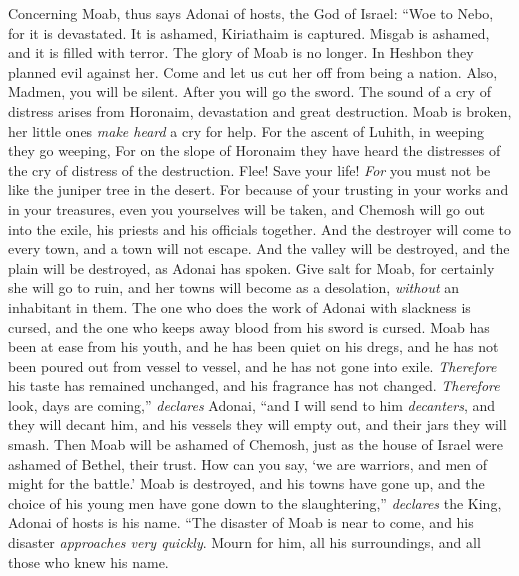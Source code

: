 \begin{biblechapter} %
 Concerning Moab, thus says Adonai of hosts, the God of Israel:
\verse “Woe to Nebo, 
for it is devastated. 
It is ashamed, 
Kiriathaim is captured. 
Misgab is ashamed, 
and it is filled with terror.
\verse The glory of Moab is no longer. 
In Heshbon they planned evil against her. 
Come and let us cut her off from being a nation. 
Also, Madmen, you will be silent. 
After you will go the sword.
\verse The sound of a cry of distress arises from Horonaim, 
devastation and great destruction.
\verse Moab is broken, 
her little ones \textit{make heard} a cry for help.
\verse For the ascent of Luhith, 
in weeping they go weeping, 
For on the slope of Horonaim they have heard 
the distresses of the cry of distress of the destruction.
\verse Flee! Save your life! 
\textit{For} you must not be like the juniper tree in the desert.
\verse For because of your trusting in your works and in your treasures, 
even you yourselves will be taken, 
and Chemosh will go out into the exile, 
his priests and his officials together.
\verse And the destroyer will come to every town, 
and a town will not escape. 
And the valley will be destroyed, 
and the plain will be destroyed, as Adonai has spoken.
\verse Give salt for Moab, 
for certainly she will go to ruin, 
and her towns will become as a desolation, 
\textit{without} an inhabitant in them.
\verse The one who does the work of Adonai with slackness is cursed, 
and the one who keeps away blood from his sword is cursed.
\verse Moab has been at ease from his youth, 
and he has been quiet on his dregs, 
and he has not been poured out from vessel to vessel, 
and he has not gone into exile. 
\textit{Therefore} his taste has remained unchanged, 
and his fragrance has not changed.
\verse \textit{Therefore} look, days are coming,” \textit{declares} Adonai, 
“and I will send to him \textit{decanters}, 
and they will decant him, 
and his vessels they will empty out, 
and their jars they will smash.
\verse Then Moab will be ashamed of Chemosh, 
just as the house of Israel were ashamed of Bethel, their trust.
\verse How can you say, ‘we are warriors, 
and men of might for the battle.’
\verse Moab is destroyed, 
and his towns have gone up, 
and the choice of his young men have gone down to the slaughtering,” 
\textit{declares} the King, Adonai of hosts is his name.
\verse “The disaster of Moab is near to come, 
and his disaster \textit{approaches very quickly}.
\verse Mourn for him, all his surroundings, 
and all those who knew his name. 

\end{biblechapter}
